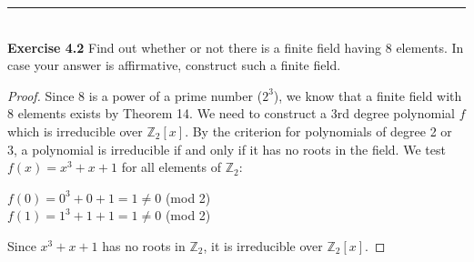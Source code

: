 \documentclass[a4paper]{article}
\begin{document}
\noindent\rule{12cm}{0.4pt}\\
\noindent \textbf{Exercise 4.2} Find out whether or not there is a finite field having 8 elements. In case your answer is affirmative, construct such a finite field.
\begin{proof}
Since 8 is a power of a prime number ($2^3$), we know that a finite field with 8 elements exists by Theorem 14. We need to construct a 3rd degree polynomial $f$ which is irreducible over $\mathbb{Z}_{2}[x]$. By the criterion for polynomials of degree 2 or 3, a polynomial is irreducible if and only if it has no roots in the field. We test $f(x) = x^3 + x + 1$ for all elements of $\mathbb{Z}_{2}$:
\begin{center}
$f(0) = 0^3 + 0 + 1 = 1 \neq 0$ (mod 2)\\
$f(1) = 1^3 + 1 + 1 = 1 \neq 0$ (mod 2)
\end{center}
Since $x^3 + x + 1$ has no roots in $\mathbb{Z}_2$, it is irreducible over $\mathbb{Z}_{2}[x]$. 


\end{proof}
\end{document}
